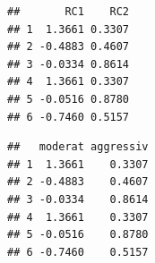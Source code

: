 \documentclass[]{article}
\newenvironment{Shaded}{\begin{snugshade}}{\end{snugshade}}
\newcommand{\KeywordTok}[1]{\textcolor[rgb]{0.13,0.29,0.53}{\textbf{{#1}}}}
\newcommand{\DecValTok}[1]{\textcolor[rgb]{0.00,0.00,0.81}{{#1}}}
\newcommand{\StringTok}[1]{\textcolor[rgb]{0.31,0.60,0.02}{{#1}}}
\newcommand{\CommentTok}[1]{\textcolor[rgb]{0.56,0.35,0.01}{\textit{{#1}}}}
\newcommand{\NormalTok}[1]{{#1}}
\begin{document}
\begin{Shaded}
\end{Shaded}

\begin{verbatim}
##       RC1    RC2
## 1  1.3661 0.3307
## 2 -0.4883 0.4607
## 3 -0.0334 0.8614
## 4  1.3661 0.3307
## 5 -0.0516 0.8780
## 6 -0.7460 0.5157
\end{verbatim}

\begin{Shaded}
\end{Shaded}

\begin{verbatim}
##   moderat aggressiv
## 1  1.3661    0.3307
## 2 -0.4883    0.4607
## 3 -0.0334    0.8614
## 4  1.3661    0.3307
## 5 -0.0516    0.8780
## 6 -0.7460    0.5157
\end{verbatim}

\begin{Shaded}
\end{Shaded}
\end{document}
